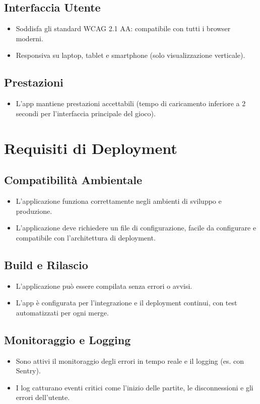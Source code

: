 \documentclass{article}
\begin{document}
\subsection{Interfaccia Utente}
\begin{itemize}
    \item Soddisfa gli standard WCAG 2.1 AA: compatibile con tutti i browser moderni.
    \item Responsiva su laptop, tablet e smartphone (solo visualizzazione verticale).
\end{itemize}

\subsection{Prestazioni}
\begin{itemize}
    \item L'app mantiene prestazioni accettabili (tempo di caricamento inferiore a 2 secondi per l'interfaccia principale del gioco).
\end{itemize}

\section{Requisiti di Deployment}

\subsection{Compatibilità Ambientale}
\begin{itemize}
    \item L'applicazione funziona correttamente negli ambienti di sviluppo e produzione.
    \item L'applicazione deve richiedere un file di configurazione, facile da configurare e compatibile con l'architettura di deployment.
\end{itemize}

\subsection{Build e Rilascio}
\begin{itemize}
    \item L'applicazione può essere compilata senza errori o avvisi.
    \item L'app è configurata per l'integrazione e il deployment continui, con test automatizzati per ogni merge.
\end{itemize}

\subsection{Monitoraggio e Logging}
\begin{itemize}
    \item Sono attivi il monitoraggio degli errori in tempo reale e il logging (es. con Sentry).
    \item I log catturano eventi critici come l'inizio delle partite, le disconnessioni e gli errori dell'utente.
\end{itemize}
\end{document}
